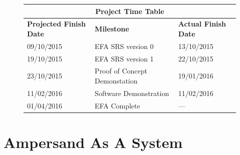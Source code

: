 \documentclass[12pt]{report}
\begin{document}
\newpage

\tableofcontents
\listoffigures
\listoftables

\newpage
{} %

\setlength{\arrayrulewidth}{0.35mm}
\setlength{\tabcolsep}{16pt}
\renewcommand{\arraystretch}{2}
\begin{figure}
	\begin{adjustwidth}{-1cm}{}
	\begin{tabular}{ |m{4cm}|m{6cm}|m{4cm}|  }
		\hline
		\multicolumn{3}{|c|}{\bfseries{Project Time Table}} \\
		\hline
		\bfseries{Projected Finish Date}& \bfseries{Milestone} & 
		\bfseries{Actual Finish Date} \\
		\hline
		 09/10/2015& EFA SRS version 0 & 13/10/2015 \\
		19/10/2015 & EFA SRS version 1  & 22/10/2015 \\
		23/10/2015 & Proof of Concept Demonstation & 19/01/2016 \\
		11/02/2016 & Software Demonstration & 11/02/2016 \\
		01/04/2016 & EFA Complete & --- \\
		\hline
	\end{tabular}
	\end{adjustwidth}
\end{figure}
\chapter{Ampersand As A System}\label{ch:Intro}
\end{document}
